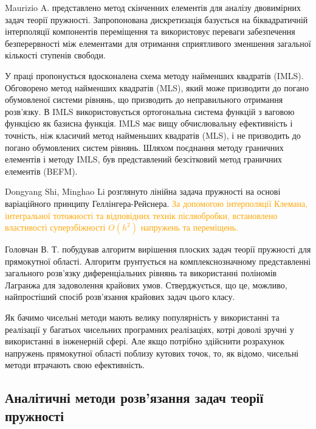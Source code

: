Maurizio A. \cite{maurizio_1} представлено метод скінченних елементів для аналізу двовимірних задач теорії пружності.
Запропонована дискретизація базується на біквадратичній інтерполяції компонентів переміщення та
використовує переваги забезпечення безперервності між елементами для отримання сприятливого зменшення загальної кількості ступенів свободи.

У праці \cite{liew_1} пропонується вдосконалена схема методу найменших квадратів (IMLS).
Обговорено метод найменших квадратів (MLS), який може призводити до погано обумовленої системи рівнянь,
що призводить до неправильного отримання розв'язку.
В IMLS використовується ортогональна система функцій з ваговою функцією як базисна функція.
IMLS має вищу обчислювальну ефективність і точність, ніж класичий метод найменьших квадратів (MLS),
і не призводить до погано обумовлених систем рівнянь.
Шляхом поєднання методу граничних елементів і методу IMLS, був представлений безсітковий метод граничних елементів (BEFM).

Dongyang Shi, Minghao Li \cite{dong_1} розглянуто лінійна задача пружності на основі варіаційного принципу Геллінгера-Рейснера.
\textcolor{orange}{За допомогою інтерполяції Клемана, інтегральної тотожності та відповідних технік післяобробки,
встановлено властивості суперзбіжності $O(h^2)$ напружень та переміщень.}

Головчан В. Т. \cite{golovchan_1} побудував алгоритм вирішення плоских задач теорії пружності для прямокутної області.
Алгоритм ґрунтується на комплекснозначному представленні загального розв'язку диференціальних рівнянь
та використанні поліномів Лагранжа для задоволення крайових умов.
Стверджується, що це, можливо, найпростіший спосіб розв'язання крайових задач цього класу.

Як бачимо чисельні методи мають велику популярність у використанні та реалізації у багатьох чисельних програмних реалізаціях,
котрі доволі зручні у використанні в інженерній сфері.
Але якщо потрібно здійснити розрахунок напружень прямокутної області поблизу кутових точок,
то, як відомо, чисельні методи втрачають свою ефективність.

\subsection{Аналітичні методи розв'язання задач теорії пружності}

